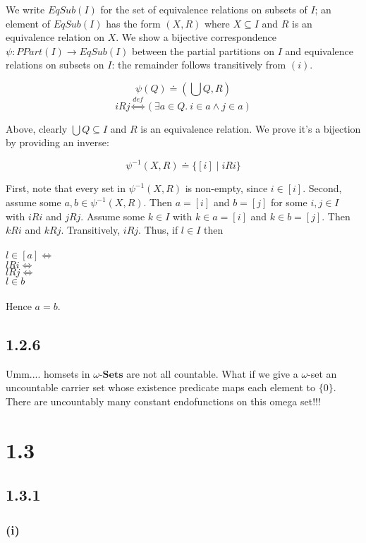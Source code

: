 \documentclass{article}
\newcommand{\mbf}{\mathbf}
\begin{document}
We write $EqSub(I)$ for the set of equivalence relations on subsets of $I$; an element of $EqSub(I)$ has the form
$(X, R)$ where $X \subseteq I$ and $R$ is an equivalence relation on $X$. 
We show a bijective correspondence $\psi : PPart(I) \to EqSub(I)$ between the partial partitions on $I$ and 
equivalence relations on subsets on $I$: the remainder follows transitively from $(i)$.

$$\psi(Q) \doteq (\bigcup Q, R)$$
$$iRj \overset{def}{\Leftrightarrow} (\exists a \in Q.~i \in a \wedge j \in a)$$

Above, clearly $\bigcup Q \subseteq I$ and $R$ is an equivalence relation.
We prove it's a bijection by providing an inverse:

$$\psi^{-1}(X,R) \doteq \{ [i] \mid iRi \}$$
 
First, note that every set in $\psi^{-1}(X,R)$ is non-empty, since $i \in [i]$.
Second, assume some $a,b \in \psi^{-1}(X,R)$. Then $a = [i]$ and $b = [j]$ for some $i,j \in I$ with $iRi$ and $jRj$.
Assume some $k \in I$ with $k \in a = [i]$ and $k \in b = [j]$. Then $kRi$ and $kRj$. Transitively, $iRj$. 
Thus, if $l \in I$ then\\~\\
$l \in [a] \Leftrightarrow$\\
$lRi \Leftrightarrow$\\
$lRj \Leftrightarrow$\\
$l \in b$\\~\\
Hence $a = b$.

\subsection*{1.2.6}

Umm.... homsets in $\omega$-$\mbf{Sets}$ are not all countable.
What if we give a $\omega$-set an uncountable carrier set whose existence predicate maps each 
element to $\{ 0 \}$. There are uncountably many constant endofunctions on this omega set!!!
 

\section*{1.3}

\subsection*{1.3.1}

\subsubsection*{(i)}
\end{document}
